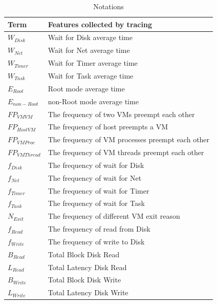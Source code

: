 \documentclass[10pt, conference, compsocconf]{IEEEtran}
\begin{document}
\begin{table}
\caption{Notations}
\centering
\begin{tabular}{ll}
  \hline
  \rowcolor{Gray}
  \footnotesize \textbf{Term} & \footnotesize \textbf{Features collected by tracing} \\
  \hline
  \hline
  \footnotesize \textit{$W_{Disk}$} & \footnotesize Wait for Disk average time\\
  \footnotesize \textit{$W_{Net}$} & \footnotesize Wait for Net average time\\
  \footnotesize \textit{$W_{Timer}$} & \footnotesize Wait for Timer average time\\
  \footnotesize \textit{$W_{Task}$} & \footnotesize Wait for Task average time\\
  \footnotesize \textit{$E_{Root}$} & \footnotesize Root mode average time\\
  \footnotesize \textit{$E_{non-Root}$} & \footnotesize non-Root mode average time\\
  \footnotesize \textit{$FP_{VMVM}$} & \footnotesize The frequency of two VMs preempt each other\\
  \footnotesize \textit{$FP_{HostVM}$} & \footnotesize The frequency of host preempts a VM\\
  \footnotesize \textit{$FP_{VMProc}$} & \footnotesize The frequency of VM processes preempt each other\\
  \footnotesize \textit{$FP_{VMThread}$} & \footnotesize The frequency of VM threads preempt each other\\
  \footnotesize \textit{$f_{Disk}$} & \footnotesize The frequency of wait for Disk\\
  \footnotesize \textit{$f_{Net}$} & \footnotesize The frequency of wait for Net\\
  \footnotesize \textit{$f_{Timer}$} & \footnotesize The frequency of wait for Timer\\
  \footnotesize \textit{$f_{Task}$} & \footnotesize The frequency of wait for Task\\
  \footnotesize \textit{$N_{Exit}$} & \footnotesize The frequency of different VM exit reason\\
  \footnotesize \textit{$f_{Read}$} & \footnotesize The frequency of read from Disk\\
  \footnotesize \textit{$f_{Write}$} & \footnotesize The frequency of write to Disk\\
  \footnotesize \textit{$B_{Read}$} & \footnotesize Total Block Disk Read\\
  \footnotesize \textit{$L_{Read}$} & \footnotesize Total Latency Disk Read\\
  \footnotesize \textit{$B_{Write}$} & \footnotesize Total Block Disk Write\\
  \footnotesize \textit{$L_{Write}$} & \footnotesize Total Latency Disk Write\\
  \hline
\end{tabular}
\label{tab:notation}
\end{table}
\end{document}
